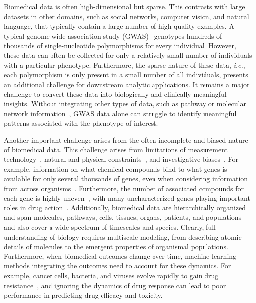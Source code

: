 \documentclass[5p]{elsarticle}
\newcommand{\ie}{\emph{i.e.}\xspace}
\newcommand{\rev}[1]{{\color{black}#1}}
\begin{document}
Biomedical data is often high-dimensional but sparse.
This contrasts with large datasets in other domains, such as social networks, computer vision, and natural language, that typically contain a large number of high-quality examples.
A typical geno\-me-wide association study (GWAS)~\cite{Hu2016gwas} genotypes hundreds of thousands of single-nucleotide polymorphisms for every individual.
However, these data can often be collected for only a relatively small number of individuals with a particular phenotype.
Furthermore, the sparse nature of these data, \ie, each polymorphism is only present in a small number of all individuals, presents an additional challenge for downstream analytic applications.
It remains a major challenge to convert these data into biologically and clinically meaningful insights.
Without integrating other types of data, such as pathway or molecular network information~\cite{Linghu2009genome,Hofree2013network,Lundby2014annotation}, GWAS data alone can struggle to identify meaningful patterns associated with the phenotype of interest.

Another important challenge arises from the often incomplete and biased nature of biomedical data.
This challenge \rev{ari\-ses} from  limitations of measurement technology~\cite{Zitnik2015impute}, natural and physical constraints~\rev{\cite{Hu2016gwas,Hyde2016identification}}, and investigative biases~\cite{Menche2015}.
For example, \rev{information on what chemical compounds bind to what genes is available for only several thousands of genes, even when considering information from across organisms}~\cite{Campillos2008}.
Furthermore, the number of associated compounds for each gene is highly uneven~\cite{Zong2017deep}, with many uncharacterized genes playing important roles in drug action~\cite{Hodos2016}.
Additionally, biome\-dical data are hierarchically organized and span molecules, pathways, cells, tissues, organs, patients, and populations~\cite{Carvunis2014siri,Greene2015understanding,Zitnik2017ohmnet} and also cover a wide spectrum of time\-sca\-les and species.
Clearly, full understanding of biology requires multiscale modeling, from describing atomic details of mo\-le\-cules to the emergent properties of organismal populations.
Furthermore, when biomedical outcomes change over time, machine learning methods integrating the outcomes need to account for these dynamics.
For example, cancer cells, bacteria, and viruses evolve rapidly to gain drug \rev{resistance~\cite{Bicker2017},} and ignoring the dynamics of drug response can lead to poor performance in predicting drug efficacy and toxicity.
\end{document}
